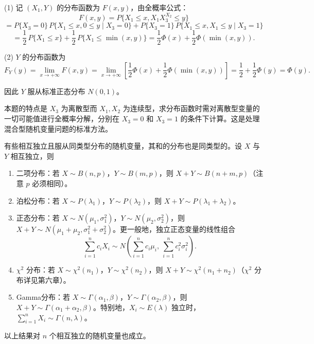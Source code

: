 \documentclass[lang=cn,11pt]{elegantbook}
\begin{document}
\begin{solution}
(1) 记 $(X_1, Y)$ 的分布函数为 $F(x,y)$，由全概率公式：
\[
F(x,y) = P\{X_1 \leqslant x, X_1 X_3^{X_2} \leqslant y\}
\]
\[
= P\{X_3 = 0\}\,P\{X_1 \leqslant x, 0 \leqslant y \mid X_3 = 0\} + P\{X_3 = 1\}\,P\{X_1 \leqslant x, X_1 \leqslant y \mid X_3 = 1\}
\]
\[
= \frac{1}{2}\,P\{X_1 \leqslant x\} + \frac{1}{2}\,P\{X_1 \leqslant \min(x, y)\} = \frac{1}{2}\Phi(x) + \frac{1}{2}\Phi(\min(x, y)).
\]

(2) $Y$ 的分布函数为
\[
F_Y(y) = \lim_{x \to +\infty}F(x,y) = \lim_{x \to +\infty}\left[\frac{1}{2}\Phi(x) + \frac{1}{2}\Phi(\min(x, y))\right] = \frac{1}{2} + \frac{1}{2}\Phi(y) = \Phi(y).
\]

因此 $Y$ 服从标准正态分布 $N(0,1)$。

\begin{note}
本题的特点是 $X_3$ 为离散型而 $X_1, X_2$ 为连续型，求分布函数时需对离散型变量的一切可能值进行全概率分解，分别在 $X_3 = 0$ 和 $X_3 = 1$ 的条件下计算。这是处理混合型随机变量问题的标准方法。
\end{note}
\end{solution}

\begin{property}[常见分布的可加性]\label{prop:additivity}
有些相互独立且服从同类型分布的随机变量，其和的分布也是同类型的。设 $X$ 与 $Y$ 相互独立，则
\begin{enumerate}
    \item 二项分布：若 $X \sim B(n,p)$，$Y \sim B(m,p)$，则 $X + Y \sim B(n+m,p)$（注意 $p$ 必须相同）。
    \item 泊松分布：若 $X \sim P(\lambda_1)$，$Y \sim P(\lambda_2)$，则 $X + Y \sim P(\lambda_1 + \lambda_2)$。
    \item 正态分布：若 $X \sim N(\mu_1, \sigma_1^2)$，$Y \sim N(\mu_2, \sigma_2^2)$，则 $X + Y \sim N(\mu_1 + \mu_2, \sigma_1^2 + \sigma_2^2)$。更一般地，独立正态变量的线性组合
    \[
    \sum_{i=1}^{n}c_i X_i \sim N\!\left(\sum_{i=1}^{n}c_i\mu_i,\ \sum_{i=1}^{n}c_i^2\sigma_i^2\right).
    \]
    \item $\chi^2$ 分布：若 $X \sim \chi^2(n_1)$，$Y \sim \chi^2(n_2)$，则 $X + Y \sim \chi^2(n_1 + n_2)$（$\chi^2$ 分布详见第六章）。
    \item Gamma分布：若 $X \sim \Gamma(\alpha_1, \beta)$，$Y \sim \Gamma(\alpha_2, \beta)$，则 $X + Y \sim \Gamma(\alpha_1 + \alpha_2, \beta)$。特别地，$X_i \sim E(\lambda)$ 独立时，$\sum_{i=1}^{n}X_i \sim \Gamma(n, \lambda)$。
\end{enumerate}
以上结果对 $n$ 个相互独立的随机变量也成立。
\end{property}
\end{document}
